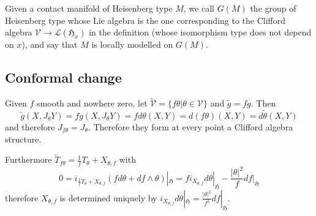 \documentclass{article}
\newcommand{\ci}[1]{\mathscr{#1}}%
\newcommand{\g}[1]{\mathfrak{#1}}
\theoremstyle{definition}
\theoremstyle{remark}
\begin{document}
Given a contact manifold of Heisenberg type $M$, we call $G(M)$ the group of Heisenberg type whose Lie algebra is the one corresponding to the Clifford algebra $\ci{V}\to\ci{L}(\g{H}_x)$ in the definition (whose isomorphism type does not depend on $x$), and say that $M$ is locally modelled on $G(M)$.

\subsection{Conformal change}\label{SezioneCambioConforme}
Given $f$ smooth and nowhere zero, let $\widetilde{\ci{V}}=\{f\theta|\theta\in\ci{V}\}$ and $\widetilde{g}=fg$. Then
$$\widetilde{g}(X,J_{\theta}Y)= fg(X,J_{\theta}Y) = fd\theta(X,Y) = d(f\theta)(X,Y) = d\widetilde{\theta}(X,Y)$$
and therefore $J_{f\theta}=J_{\theta}$.
Therefore they form at every point a Clifford algebra structure.

Furthermore $\widetilde{T}_{f\theta}=\frac{1}{f}T_{\theta}+X_{\theta,f}$ with
$$0=i_{\frac{1}{f}T_{\theta}+X_{\theta,f}}(fd\theta +df\wedge\theta)|_{\g{H}} = fi_{X_{\theta,f}}d\theta|_{\g{H}} - \frac{|\theta|^2}{f}df|_{\g{H}} $$
therefore $X_{\theta,f}$ is determined uniquely by $i_{X_{\theta,f}}d\theta|_{\g{H}} = \frac{|\theta|^2}{f^2}df|_{\g{H}}$.
\end{document}
